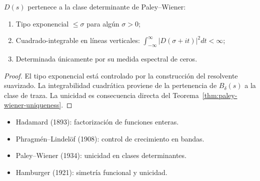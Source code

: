 \begin{proposition}\label{prop:pw-class}
$D(s)$ pertenece a la clase determinante de Paley–Wiener:
\begin{enumerate}
\item Tipo exponencial $\leq \sigma$ para algún $\sigma > 0$;
\item Cuadrado-integrable en líneas verticales: $\int_{-\infty}^\infty |D(\sigma+it)|^2 dt < \infty$;
\item Determinada únicamente por su medida espectral de ceros.
\end{enumerate}
\end{proposition}

\begin{proof}
El tipo exponencial está controlado por la construcción del resolvente suavizado.  
La integrabilidad cuadrática proviene de la pertenencia de $B_\delta(s)$ a la clase de traza.  
La unicidad es consecuencia directa del Teorema~\ref{thm:paley-wiener-uniqueness}.
\end{proof}

\begin{remark}
\begin{itemize}
\item Hadamard (1893): factorización de funciones enteras.  
\item Phragmén–Lindelöf (1908): control de crecimiento en bandas.  
\item Paley–Wiener (1934): unicidad en clases determinantes.  
\item Hamburger (1921): simetría funcional y unicidad.  
\end{itemize}
\end{remark}
